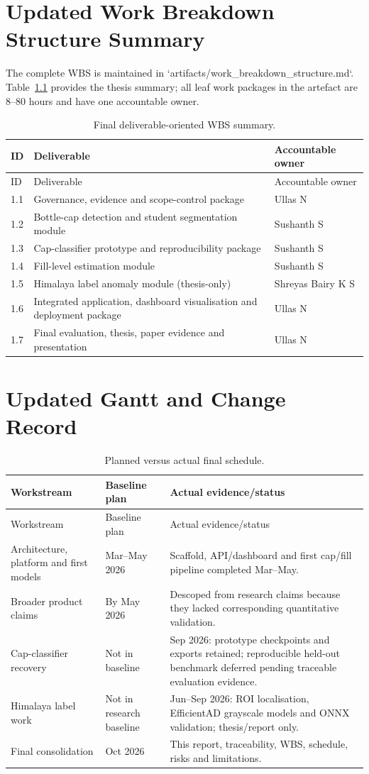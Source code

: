 \documentclass[12pt,a4paper]{report}
\begin{document}
\chapter{Updated Work Breakdown Structure Summary}
The complete WBS is maintained in `artifacts/work_breakdown_structure.md`. Table~\ref{tab:wbs} provides the thesis summary; all leaf work packages in the artefact are 8--80 hours and have one accountable owner.
\begin{longtable}{p{}p{}p{}}\caption{Final deliverable-oriented WBS summary.}\label{tab:wbs}\\\toprule ID & Deliverable & Accountable owner\\\midrule\endfirsthead\toprule ID & Deliverable & Accountable owner\\\midrule\endhead
1.1 & Governance, evidence and scope-control package & Ullas N\\1.2 & Bottle-cap detection and student segmentation module & Sushanth S\\1.3 & Cap-classifier prototype and reproducibility package & Sushanth S\\1.4 & Fill-level estimation module & Sushanth S\\1.5 & Himalaya label anomaly module (thesis-only) & Shreyas Bairy K S\\1.6 & Integrated application, dashboard visualisation and deployment package & Ullas N\\1.7 & Final evaluation, thesis, paper evidence and presentation & Ullas N\\\bottomrule\end{longtable}

\chapter{Updated Gantt and Change Record}
\begin{longtable}{p{}p{}p{}}\caption{Planned versus actual final schedule.}\label{tab:gantt}\\\toprule Workstream & Baseline plan & Actual evidence/status\\\midrule\endfirsthead\toprule Workstream & Baseline plan & Actual evidence/status\\\midrule\endhead
Architecture, platform and first models & Mar--May 2026 & Scaffold, API/dashboard and first cap/fill pipeline completed Mar--May.\\
Broader product claims & By May 2026 & Descoped from research claims because they lacked corresponding quantitative validation.\\
Cap-classifier recovery & Not in baseline & Sep 2026: prototype checkpoints and exports retained; reproducible held-out benchmark deferred pending traceable evaluation evidence.\\
Himalaya label work & Not in research baseline & Jun--Sep 2026: ROI localisation, EfficientAD grayscale models and ONNX validation; thesis/report only.\\
Final consolidation & Oct 2026 & This report, traceability, WBS, schedule, risks and limitations.\\\bottomrule\end{longtable}
\end{document}
